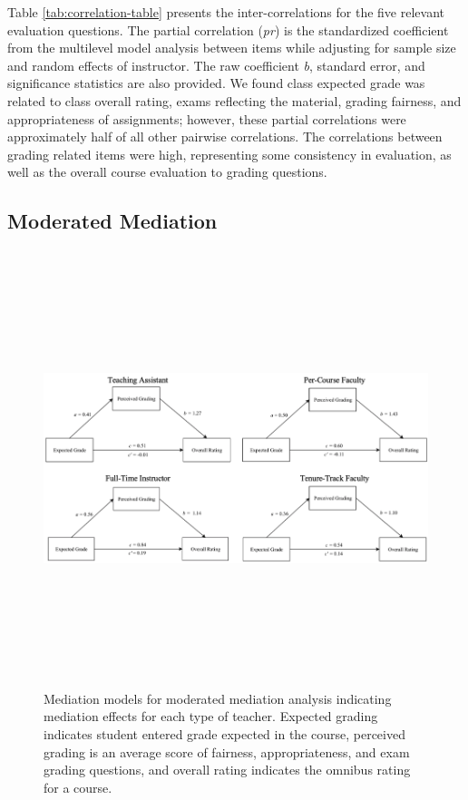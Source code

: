 \documentclass[man]{apa6}
\theoremstyle{definition}
\theoremstyle{definition}
\theoremstyle{definition}
\theoremstyle{remark}
\begin{document}
Table \ref{tab:correlation-table} presents the inter-correlations for the five relevant evaluation questions. The partial correlation (\emph{pr}) is the standardized coefficient from the multilevel model analysis between items while adjusting for sample size and random effects of instructor. The raw coefficient \emph{b}, standard error, and significance statistics are also provided. We found class expected grade was related to class overall rating, exams reflecting the material, grading fairness, and appropriateness of assignments; however, these partial correlations were approximately half of all other pairwise correlations. The correlations between grading related items were high, representing some consistency in evaluation, as well as the overall course evaluation to grading questions.

\subsection{Moderated Mediation}\label{moderated-mediation}

\begin{figure}
\includegraphics[width=7in,height=5in]{complete_medmod} \caption{Mediation models for moderated mediation analysis indicating mediation effects for each type of teacher. Expected grading indicates student entered grade expected in the course, perceived grading is an average score of fairness, appropriateness, and exam grading questions, and overall rating indicates the omnibus rating for a course.}\label{fig:med-mod-pic}
\end{figure}
\end{document}
